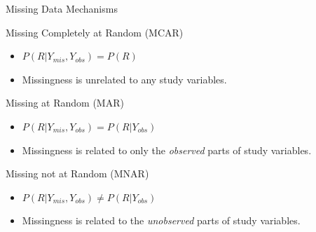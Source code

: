 \documentclass{beamer}\usepackage[]{graphicx}\usepackage[]{color}
\begin{document}
\watermarkon %



\begin{frame}{Missing Data Mechanisms}

  Missing Completely at Random (MCAR)
  \begin{itemize}
  \item $P(R | Y_{mis}, Y_{obs}) = P(R)$
    \vc
  \item Missingness is unrelated to any study variables.
  \end{itemize}
  \vb

  Missing at Random (MAR)
  \begin{itemize}
  \item $P(R | Y_{mis}, Y_{obs}) = P(R | Y_{obs})$
    \vc
  \item Missingness is related to only the \emph{observed} parts of study
      variables.
  \end{itemize}
  \vb

  Missing not at Random (MNAR)
  \begin{itemize}
  \item $P(R | Y_{mis}, Y_{obs}) \neq P(R | Y_{obs})$
    \vc
  \item Missingness is related to the \emph{unobserved} parts of study
    variables.
  \end{itemize}

\end{frame}

\watermarkoff %
\end{document}
